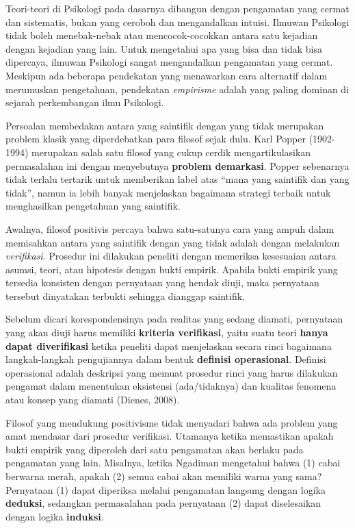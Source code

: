 \documentclass[
  english,
  man]{apa6}
\begin{document}
Teori-teori di Psikologi pada dasarnya dibangun dengan pengamatan yang cermat dan sistematis, bukan yang ceroboh dan mengandalkan intuisi. Ilmuwan Psikologi tidak boleh menebak-nebak atau mencocok-cocokkan antara satu kejadian dengan kejadian yang lain. Untuk mengetahui apa yang bisa dan tidak bisa dipercaya, ilmuwan Psikologi sangat mengandalkan pengamatan yang cermat. Meskipun ada beberapa pendekatan yang menawarkan cara alternatif dalam merumuskan pengetahuan, pendekatan \emph{empirisme} adalah yang paling dominan di sejarah perkembangan ilmu Psikologi.

Persoalan membedakan antara yang saintifik dengan yang tidak merupakan problem klasik yang diperdebatkan para filosof sejak dulu. Karl Popper (1902-1994) merupakan salah satu filosof yang cukup cerdik mengartikulasikan permasalahan ini dengan menyebutnya \textbf{problem demarkasi}. Popper sebenarnya tidak terlalu tertarik untuk memberikan label atas \enquote{mana yang saintifik dan yang tidak}, namun ia lebih banyak menjelaskan bagaimana strategi terbaik untuk menghasilkan pengetahuan yang saintifik.

Awalnya, filosof positivis percaya bahwa satu-satunya cara yang ampuh dalam memisahkan antara yang saintifik dengan yang tidak adalah dengan melakukan \emph{verifikasi}. Prosedur ini dilakukan peneliti dengan memeriksa kesesuaian antara asumsi, teori, atau hipotesis dengan bukti empirik. Apabila bukti empirik yang tersedia konsisten dengan pernyataan yang hendak diuji, maka pernyataan tersebut dinyatakan terbukti sehingga dianggap saintifik.

Sebelum dicari korespondensinya pada realitas yang sedang diamati, pernyataan yang akan diuji harus memiliki \textbf{kriteria verifikasi}, yaitu suatu teori \textbf{hanya dapat diverifikasi} ketika peneliti dapat menjelaskan secara rinci bagaimana langkah-langkah pengujiannya dalam bentuk \textbf{definisi operasional}. Definisi operasional adalah deskripsi yang memuat prosedur rinci yang harus dilakukan pengamat dalam menentukan eksistensi (ada/tidaknya) dan kualitas fenomena atau konsep yang diamati (Dienes, 2008).

Filosof yang mendukung positivisme tidak menyadari bahwa ada problem yang amat mendasar dari prosedur verifikasi. Utamanya ketika memastikan apakah bukti empirik yang diperoleh dari satu pengamatan akan berlaku pada pengamatan yang lain. Misalnya, ketika Ngadiman mengetahui bahwa (1) cabai berwarna merah, apakah (2) semua cabai akan memiliki warna yang sama? Pernyataan (1) dapat diperiksa melalui pengamatan langsung dengan logika \textbf{deduksi}, sedangkan permasalahan pada pernyataan (2) dapat diselesaikan dengan logika \textbf{induksi}.
\end{document}
